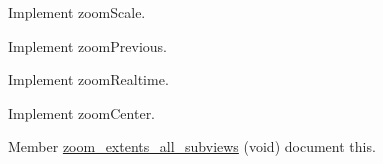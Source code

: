 \begin{DoxyRefList}
\label{todo__todo000123}%
%
Implement zoom\+Scale. 

\label{todo__todo000121}%
%
Implement zoom\+Previous. 

\label{todo__todo000122}%
%
Implement zoom\+Realtime. 

\label{todo__todo000119}%
%
Implement zoom\+Center.  
\item[Member \mbox{\hyperlink{imgui__main_8c_a6e94b00a9d38e575f3404ff95c879ed8}{zoom\+\_\+extents\+\_\+all\+\_\+subviews}} (void)]\label{todo__todo000013}%
%
document this. 
\end{DoxyRefList}